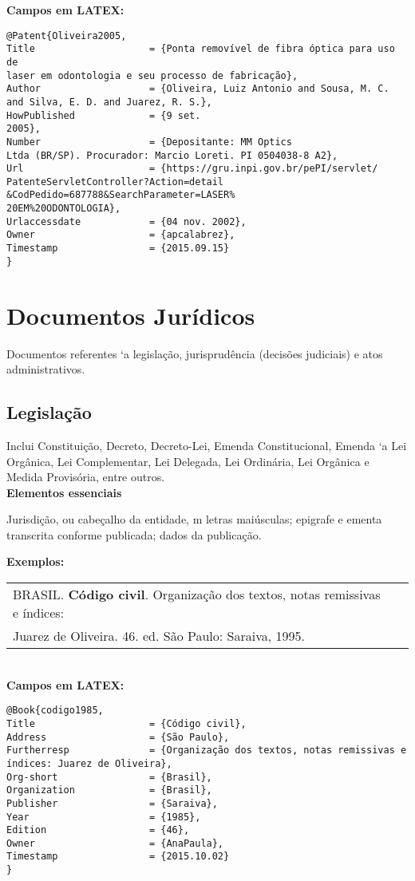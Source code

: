 \textbf{Campos em LATEX:} 

\begin{verbatim}
@Patent{Oliveira2005,
Title                    = {Ponta removível de fibra óptica para uso de
laser em odontologia e seu processo de fabricação},
Author                   = {Oliveira, Luiz Antonio and Sousa, M. C. 
and Silva, E. D. and Juarez, R. S.},
HowPublished             = {9 set.
2005},
Number                   = {Depositante: MM Optics
Ltda (BR/SP). Procurador: Marcio Loreti. PI 0504038-8 A2},
Url                      = {https://gru.inpi.gov.br/pePI/servlet/
PatenteServletController?Action=detail
&CodPedido=687788&SearchParameter=LASER%
20EM%20ODONTOLOGIA},
Urlaccessdate            = {04 nov. 2002},
Owner                    = {apcalabrez},
Timestamp                = {2015.09.15}
}
\end{verbatim}

\section{Documentos Jurídicos}

Documentos referentes `a legislação, jurisprud\^encia (decisões judiciais) e
atos administrativos.

\subsection{Legislação}

 Inclui Constituição, Decreto, Decreto-Lei, Emenda Constitucional, Emenda `a Lei Org\^anica, Lei Complementar, Lei Delegada, Lei Ordin\'aria, Lei Org\^anica e Medida Provisória, entre outros.\\

\textbf{Elementos essenciais}

Jurisdição, ou cabeçalho da entidade, m letras maiúsculas; epigrafe e ementa transcrita conforme publicada; dados da publicação.

 
\textbf{Exemplos:} \\

\begin{tabular}{|l|c|} \hline
	BRASIL. \textbf{Código civil}. Organização dos textos, notas remissivas e índices: \\Juarez de Oliveira. 46. ed. São Paulo: Saraiva, 1995. 
	\\\hline
\end{tabular} \\

\textbf{Campos em LATEX:} 
\begin{verbatim}
@Book{codigo1985,
Title                    = {Código civil},
Address                  = {São Paulo},
Furtherresp              = {Organização dos textos, notas remissivas e 
índices: Juarez de Oliveira},
Org-short                = {Brasil},
Organization             = {Brasil},
Publisher                = {Saraiva},
Year                     = {1985},
Edition                  = {46},
Owner                    = {AnaPaula},
Timestamp                = {2015.10.02}
}
\end{verbatim}


